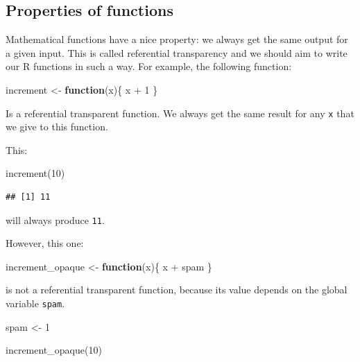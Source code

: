 \documentclass[
]{article}
\newenvironment{Shaded}{\begin{snugshade}}{\end{snugshade}}
\newcommand{\ControlFlowTok}[1]{\textcolor[rgb]{0.13,0.29,0.53}{\textbf{#1}}}
\newcommand{\DecValTok}[1]{\textcolor[rgb]{0.00,0.00,0.81}{#1}}
\newcommand{\FunctionTok}[1]{\textcolor[rgb]{0.00,0.00,0.00}{#1}}
\newcommand{\NormalTok}[1]{#1}
\newcommand{\OtherTok}[1]{\textcolor[rgb]{0.56,0.35,0.01}{#1}}
\newcommand{\SpecialCharTok}[1]{\textcolor[rgb]{0.00,0.00,0.00}{#1}}
\begin{document}
\hypertarget{properties-of-functions}{%
\subsection{Properties of functions}\label{properties-of-functions}}

Mathematical functions have a nice property: we always get the same output for a given input. This
is called referential transparency and we should aim to write our R functions in such a way.
For example, the following function:

\begin{Shaded}
\begin{Highlighting}[]
\NormalTok{increment }\OtherTok{\textless{}{-}} \ControlFlowTok{function}\NormalTok{(x)\{}
\NormalTok{    x }\SpecialCharTok{+} \DecValTok{1}
\NormalTok{\}}
\end{Highlighting}
\end{Shaded}

Is a referential transparent function. We always get the same result for any \texttt{x} that we give to
this function.

This:

\begin{Shaded}
\begin{Highlighting}[]
\FunctionTok{increment}\NormalTok{(}\DecValTok{10}\NormalTok{)}
\end{Highlighting}
\end{Shaded}

\begin{verbatim}
## [1] 11
\end{verbatim}

will always produce \texttt{11}.

However, this one:

\begin{Shaded}
\begin{Highlighting}[]
\NormalTok{increment\_opaque }\OtherTok{\textless{}{-}} \ControlFlowTok{function}\NormalTok{(x)\{}
\NormalTok{    x }\SpecialCharTok{+}\NormalTok{ spam}
\NormalTok{\}}
\end{Highlighting}
\end{Shaded}

is not a referential transparent function, because its value depends on the global variable \texttt{spam}.

\begin{Shaded}
\begin{Highlighting}[]
\NormalTok{spam }\OtherTok{\textless{}{-}} \DecValTok{1}

\FunctionTok{increment\_opaque}\NormalTok{(}\DecValTok{10}\NormalTok{)}
\end{Highlighting}
\end{Shaded}
\end{document}

